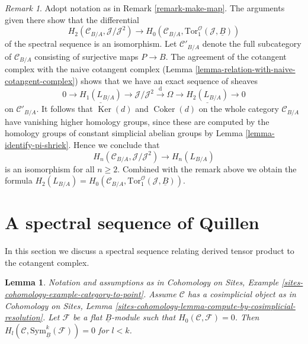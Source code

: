 \documentclass{stacks-project}
\theoremstyle{plain}
\newtheorem{lemma}[subsection]{Lemma}
\theoremstyle{definition}
\theoremstyle{remark}
\newtheorem{remark}[subsection]{Remark}
\numberwithin{equation}{subsection}
\def\Ker{\mathop{\mathrm{Ker}}}
\def\Coker{\mathop{\mathrm{Coker}}}
\begin{document}
\begin{remark}
\label{remark-surjection}
Adopt notation as in Remark \ref{remark-make-map}. The arguments given
there show that the differential
$$
H_2(\mathcal{C}_{B/A}, \mathcal{J}/\mathcal{J}^2)
\longrightarrow
H_0(\mathcal{C}_{B/A}, \text{Tor}_1^\mathcal{O}(\mathcal{J}, \underline{B}))
$$
of the spectral sequence is an isomorphism. Let $\mathcal{C}'_{B/A}$
denote the full subcategory of $\mathcal{C}_{B/A}$ consisting of surjective
maps $P \to B$. The agreement of the cotangent complex with the naive
cotangent complex (Lemma \ref{lemma-relation-with-naive-cotangent-complex})
shows that we have an exact sequence of sheaves
$$
0 \to \underline{H_1(L_{B/A})} \to
\mathcal{J}/\mathcal{J}^2 \xrightarrow{\text{d}} \Omega \to
\underline{H_2(L_{B/A})} \to 0
$$
on $\mathcal{C}'_{B/A}$. It follows that $\Ker(d)$ and
$\Coker(d)$ on the whole category $\mathcal{C}_{B/A}$ have
vanishing higher homology groups, since
these are computed by the homology groups of constant simplicial abelian
groups by Lemma \ref{lemma-identify-pi-shriek}. Hence we conclude
that
$$
H_n(\mathcal{C}_{B/A}, \mathcal{J}/\mathcal{J}^2) \to H_n(L_{B/A})
$$
is an isomorphism for all $n \geq 2$. Combined with the remark above
we obtain the formula
$H_2(L_{B/A}) =
H_0(\mathcal{C}_{B/A}, \text{Tor}_1^\mathcal{O}(\mathcal{J}, \underline{B}))$.
\end{remark}





\section{A spectral sequence of Quillen}
\label{section-spectral-sequence}

\noindent
In this section we discuss a spectral sequence relating derived
tensor product to the cotangent complex.

\begin{lemma}
\label{lemma-vanishing-symmetric-powers}
Notation and assumptions as in
Cohomology on Sites, Example \ref{sites-cohomology-example-category-to-point}.
Assume $\mathcal{C}$ has a cosimplicial object as in
Cohomology on Sites, Lemma
\ref{sites-cohomology-lemma-compute-by-cosimplicial-resolution}.
Let $\mathcal{F}$ be a flat $\underline{B}$-module such that
$H_0(\mathcal{C}, \mathcal{F}) = 0$.
Then $H_l(\mathcal{C}, \text{Sym}_{\underline{B}}^k(\mathcal{F})) = 0$
for $l < k$.
\end{lemma}
\end{document}
